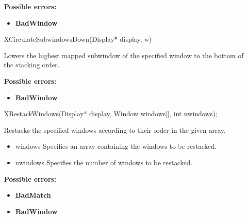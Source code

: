 \documentclass{report}
\begin{document}
\begin{itemize}
            \bigbreak \noindent
            \textbf{Possible errors:}
            \begin{itemize}
                \item \textbf{BadWindow}
            \end{itemize}

            \begin{cppcode}
                XCirculateSubwindowsDown(Display* display, w)
            \end{cppcode}
            \bigbreak \noindent
            Lowers the highest mapped subwindow of the specified window to the bottom of the stacking order.

            \bigbreak \noindent
            \textbf{Possible errors:}
            \begin{itemize}
                \item \textbf{BadWindow}
            \end{itemize}

            \begin{cppcode}
                XRestackWindows(Display* display, Window windows[], int nwindows);
            \end{cppcode}
            \bigbreak \noindent
            Restacks the specified windows according to their order in the given array.

            \begin{itemize}
                \item windows Specifies an array containing the windows to be restacked.
                \item nwindows Specifies the number of windows to be restacked.
            \end{itemize}

            \bigbreak \noindent
            \textbf{Possible errors:}
            \begin{itemize}
                \item \textbf{BadMatch}
                \item \textbf{BadWindow}
            \end{itemize}


\end{itemize}
\end{document}
